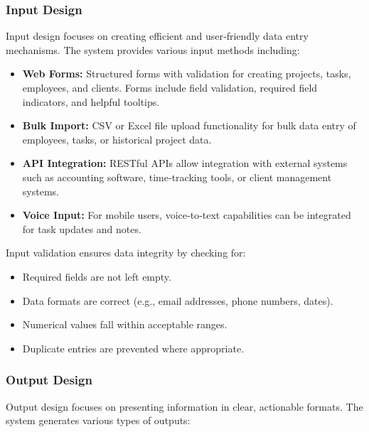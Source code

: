 \documentclass[12pt,a4paper]{article}
\begin{document}
\subsubsection{Input Design}
Input design focuses on creating efficient and user‑friendly data entry mechanisms.  The system provides various input methods including:
\begin{itemize}
    \item \textbf{Web Forms:} Structured forms with validation for creating projects, tasks, employees, and clients.  Forms include field validation, required field indicators, and helpful tooltips.
    
    \item \textbf{Bulk Import:} CSV or Excel file upload functionality for bulk data entry of employees, tasks, or historical project data.
    
    \item \textbf{API Integration:} RESTful APIs allow integration with external systems such as accounting software, time‑tracking tools, or client management systems.
    
    \item \textbf{Voice Input:} For mobile users, voice‑to‑text capabilities can be integrated for task updates and notes.
\end{itemize}

Input validation ensures data integrity by checking for:
\begin{itemize}
    \item Required fields are not left empty.
    \item Data formats are correct (e.g., email addresses, phone numbers, dates).
    \item Numerical values fall within acceptable ranges.
    \item Duplicate entries are prevented where appropriate.
\end{itemize}

\subsubsection{Output Design}
Output design focuses on presenting information in clear, actionable formats.  The system generates various types of outputs:
\end{document}
